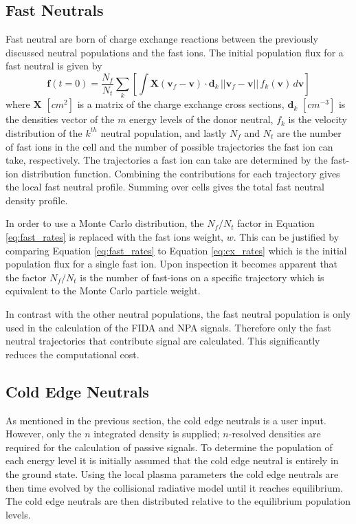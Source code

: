 \subsection{Fast Neutrals}
Fast neutral are born of charge exchange reactions between the previously discussed neutral populations and the fast ions. 
The initial population flux for a fast neutral is given by
\begin{equation}\label{eq:fast_rates}
    \mathbf{f}(t=0) = \frac{N_f}{N_{t}}\sum_k \left [ \int \mathbf{X}(\mathbf{v}_f - \mathbf{v}) \cdot \mathbf{d}_k\, ||\mathbf{v}_f - \mathbf{v}||\, f_k(\mathbf{v})\, d\mathbf{v} \right ]
\end{equation}
where $\mathbf{X}$ $[cm^2]$ is a matrix of the charge exchange cross sections, $\mathbf{d}_k$ $[cm^{-3}]$ is the densities vector of the $m$ energy levels of the donor neutral, $f_k$ is the velocity distribution of the $k^{th}$ neutral population, and lastly $N_f$ and $N_t$ are the number of fast ions in the cell and the number of possible trajectories the fast ion can take, respectively. The trajectories a fast ion can take are determined by the fast-ion distribution function. Combining the contributions for each trajectory gives the local fast neutral profile. Summing over cells gives the total fast neutral density profile.

In order to use a Monte Carlo distribution, the $N_f/N_t$ factor in Equation \ref{eq:fast_rates} is replaced with the fast ions weight, $w$. This can be justified by comparing Equation \ref{eq:fast_rates} to Equation \ref{eq:cx_rates} which is the initial population flux for a single fast ion. Upon inspection it becomes apparent that the factor $N_f/N_t$ is the number of fast-ions on a specific trajectory which is equivalent to the Monte Carlo particle weight.

In contrast with the other neutral populations, the fast neutral population is only used in the calculation of the FIDA and NPA signals. Therefore only the fast neutral trajectories that contribute signal are calculated. This significantly reduces the computational cost.

\subsection{Cold Edge Neutrals}
As mentioned in the previous section, the cold edge neutrals is a user input. However, only the $n$ integrated density is supplied; $n$-resolved densities are required for the calculation of passive signals. To determine the population of each energy level it is initially assumed that the cold edge neutral is entirely in the ground state. Using the local plasma parameters the cold edge neutrals are then time evolved by the collisional radiative model until it reaches equilibrium. The cold edge neutrals are then distributed relative to the equilibrium population levels.

